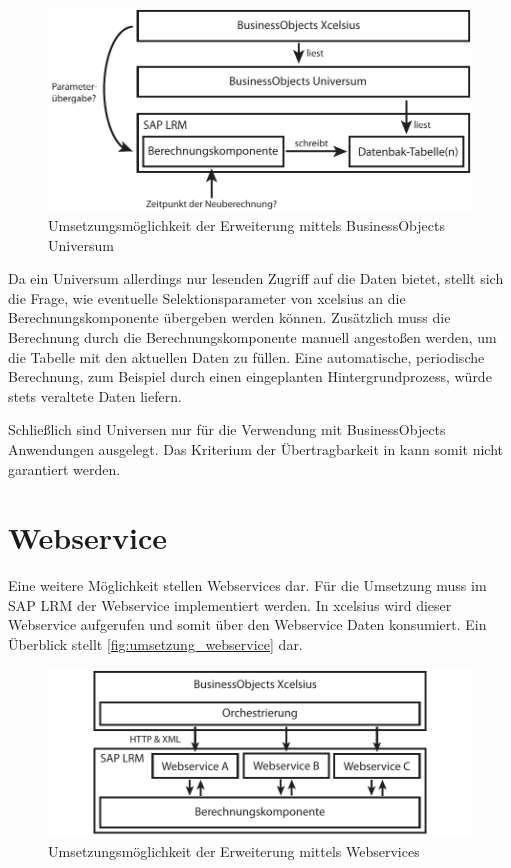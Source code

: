 \begin{onehalfspacing}
\begin{figure}[ht]
\centering
\setlength{\unitlength}{1mm}
\includegraphics[width=15cm]{images/Abbildung9-Umsetzung-Universum.pdf}
\caption{Umsetzungsmöglichkeit der Erweiterung mittels BusinessObjects Universum \label{fig:umsetzung_universe}}
\end{figure}

Da ein Universum allerdings nur lesenden Zugriff auf die Daten bietet, stellt sich die Frage, wie eventuelle Selektionsparameter von \gls{xcelsius} an die Berechnungskomponente übergeben werden können. Zusätzlich muss die Berechnung durch die Berechnungskomponente manuell angestoßen werden, um die Tabelle mit den aktuellen Daten zu füllen. Eine automatische, periodische Berechnung, zum Beispiel durch einen eingeplanten Hintergrundprozess, würde stets veraltete Daten liefern.

Schließlich sind Universen nur für die Verwendung mit BusinessObjects Anwendungen ausgelegt. Das Kriterium der Übertragbarkeit in  kann somit nicht garantiert werden.

\section{Webservice}
Eine weitere Möglichkeit stellen Webservices dar. Für die Umsetzung muss im SAP LRM der Webservice implementiert werden. In \gls{xcelsius} wird dieser Webservice aufgerufen und somit über den Webservice Daten konsumiert. Ein Überblick stellt \vref{fig:umsetzung_webservice} dar.

\begin{figure}[ht]
\centering
\setlength{\unitlength}{1mm}
\includegraphics[width=15cm]{images/Abbildung10-Umsetzung-Webservices.pdf}
\caption{Umsetzungsmöglichkeit der Erweiterung mittels Webservices \label{fig:umsetzung_webservice}}
\end{figure} 


\end{onehalfspacing}
